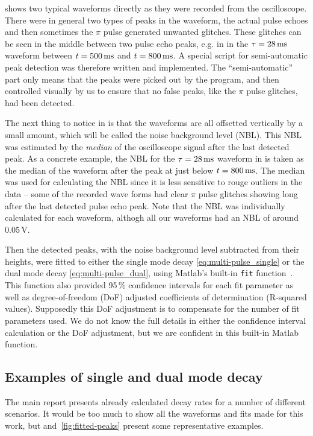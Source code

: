 \documentclass[11pt,a4paper, twocolumn,
swedish, english %
]{article}
\begin{document}
 shows two typical waveforms directly as they
were recorded from the oscilloscope. There were in general two
types of peaks in the waveform, the actual pulse echoes and then
sometimes the $\pi$ pulse generated unwanted glitches. These glitches
can be seen in the middle between two pulse echo peaks, e.g. in
 in the $\tau=\unit[28]{ms}$ waveform between
$t=\unit[500]{ms}$ and $t=\unit[800]{ms}$. A special script for
semi-automatic peak detection was therefore written and implemented. 
The ``semi-automatic'' part only means that the peaks were picked out
by the program, and then controlled visually by us to ensure that no
false peaks, like the $\pi$ pulse glitches, had been detected. 

The next thing to notice in  is that the
waveforms are all offsetted vertically by a small amount, which will
be called the noise background level (NBL). This NBL was estimated by
the \emph{median} of the oscilloscope signal after the last detected
peak. As a concrete example, the NBL for the $\tau=\unit[28]{ms}$
waveform in  is taken as the median of the
waveform after the peak at just below $t=\unit[800]{ms}$. 
The median was used for calculating the NBL since it is less sensitive
to rouge outliers in the data -- some of the recorded wave forms had
clear $\pi$ pulse glitches showing long after the last detected pulse
echo peak. Note that the NBL was individually calculated for each
waveform, althogh all our waveforms had an NBL of around 0.05\,V. 

Then the detected peaks, with the noise background level subtracted
from their heights, were fitted to either the single mode decay
\eqref{eq:multi-pulse_single} or the dual mode decay
\eqref{eq:multi-pulse_dual}, using Matlab's built-in \texttt{fit}
function~\cite{Matlab-fit}. This function also provided 95\,\%
confidence intervals for each fit parameter as well as
degree-of-freedom (DoF) adjusted coefficients of determination (R-squared
values). Supposedly this DoF adjustment is to
compensate for the number of fit parameters used. We do not know the
full details in either the confidence interval calculation or the DoF
adjustment, but we are confident in this built-in Matlab function. 



\subsection{Examples of single and dual mode decay}
The main report presents already calculated decay rates for a number
of different scenarios. It would be too much to show all the waveforms
and fits made for this work\footnotemark{}, but 
and~\ref{fig:fitted-peaks} present some representative examples. 
\end{document}
